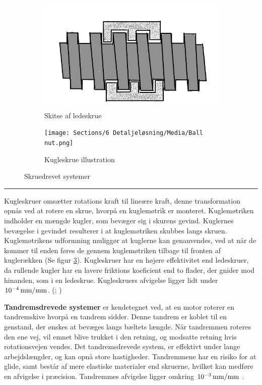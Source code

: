 \begin{figure}[H]
    \centering
    \begin{subfigure}[b]{0.49\textwidth}
    \centering
        \includegraphics[width=\linewidth]{Sections/5 Konceptgenerering/Media/Ledeskrue-skitse.png}
      \caption{Skitse af ledeskrue}
       \label{fig:Ledeskrue - skitse} %
  \end{subfigure}
    \hfill
  \begin{subfigure}[b]{0.49\textwidth}
    \centering
    \texttt{[image: Sections/6 Detaljeløsning/Media/Ball nut.png]}
    \caption{Kugleskrue illustration}
    \label{fig: Balls nut} %
  \end{subfigure}
    \caption{Skruedrevet systemer}
\end{figure} \plainbreak{-0.5}

Kugleskruer omsætter rotations kraft til lineære kraft, denne transformation opnås ved at rotere en skrue, hvorpå en kuglemøtrik er monteret. Kuglemøtriken indholder en mængde kugler, som bevæger sig i skurens gevind. Kuglernes bevægelse i gevindet resulterer i at kuglemøtriken skubbes langs skruen. Kuglemøtrikens udformning muliggør at kuglerne kan genanvendes, ved at når de kommer til enden føres de gennem kuglemøtriken tilbage til fronten af kuglerækken (Se figur \ref{fig: Balls nut}). Kugleskruer har en højere effektivitet end ledeskruer, da rullende kugler har en lavere friktions koeficient end to flader, der gnider mod hinanden, som i en ledeskrue. Kugleskruers afvigelse ligger lidt under $\SI{d-4}{mm/mm}$. (\cite{Jaffe2025PrecisionGround}; \cite{IndustrialQuickSearch2025BallBenefits})


\textbf{Tandremsdrevede systemer} er kendetegnet ved, at en motor roterer en tandremskive hvorpå en tandrem sidder. Denne tandrem er koblet til en genstand, der ønskes at bevæges langs bæltets længde. Når tandremmen roteres den ene vej, vil emnet blive trukket i den retning, og modsatte retning hvis rotationsvejen vendes. Det tandremsdrevede system, er effektivt under lange arbejdslængder, og kan opnå store hastigheder. Tandremmene har en risiko for at glide, samt består af mere elastiske materialer end skruerne, hvilket kan medføre en afvigelse i præcision. Tandremmes afvigelse ligger omkring \(\SI{d-3}{mm/mm}\) \parencite{Rollco2022BallWhat}. 

